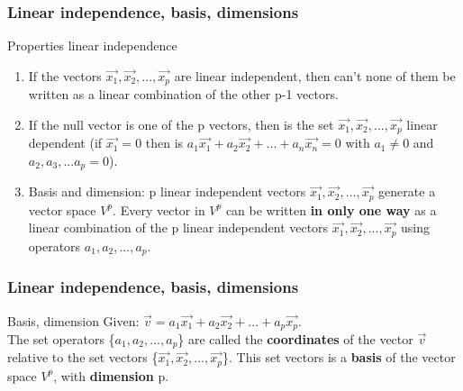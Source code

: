 \begin{frame}
	\frametitle{Linear independence, basis, dimensions}
	\begin{block}{Properties linear independence}
		\begin{enumerate}
			\item If the vectors $\overrightarrow{x_1},\overrightarrow{x_2},...,\overrightarrow{x_p}$ are linear independent, then can't none of them be written as a linear combination of the other p-1 vectors.
			\item If the null vector is one of the p vectors, then is the set $\overrightarrow{x_1},\overrightarrow{x_2},...,\overrightarrow{x_p}$ linear dependent (if $\overrightarrow{x_1}=0$ then is $a_1\overrightarrow{x_1}+a_2\overrightarrow{x_2}+...+a_n\overrightarrow{x_n}=0$ with $a_1\neq0$ and $a_2,a_3,...a_p=0$).
			\item Basis and dimension: p linear independent vectors $\overrightarrow{x_1},\overrightarrow{x_2},...,\overrightarrow{x_p}$ generate a vector space $V^p$. Every vector in $V^p$ can be written {\bf in only one way} as a linear combination of the p linear independent vectors $\overrightarrow{x_1},\overrightarrow{x_2},...,\overrightarrow{x_p}$ using operators $a_1,a_2,...,a_p$.
		\end{enumerate}
	\end{block}
\end{frame}

\begin{frame}
	\frametitle{Linear independence, basis, dimensions}
	\begin{block}{Basis, dimension}
		Given: $\overrightarrow{v}=a_1\overrightarrow{x_1}+a_2\overrightarrow{x_2}+...+a_p\overrightarrow{x_p}$.\\
		The set operators \{$a_1,a_2,...,a_p$\} are called the {\bf coordinates} of the vector $\overrightarrow{v}$ relative to the set vectors \{$\overrightarrow{x_1},\overrightarrow{x_2},...,\overrightarrow{x_p}$\}. This set vectors is a {\bf basis} of the vector space $V^p$, with {\bf dimension} p.
	\end{block}
\end{frame}

